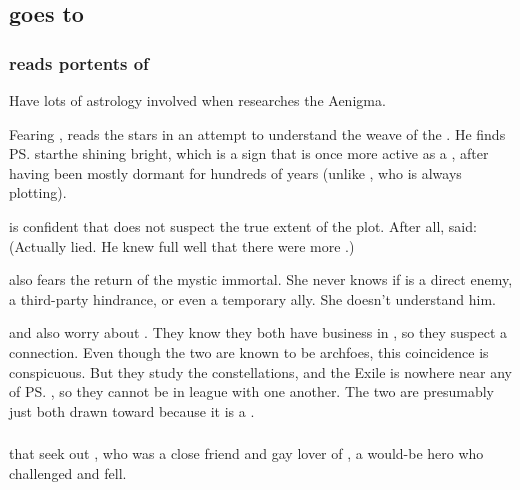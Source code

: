\subsection{\Teshrial goes to \Urizeth}
\subsubsection{\Teshrial{} reads portents of \Ishnaruchaefir}
Have lots of astrology involved when \Teshrial{} researches the Aenigma. 

Fearing \Ishnaruchaefir, \Teshrial{} reads the stars in an attempt to understand the weave of the \matrices. 
He finds \ps{\Ishnaruchaefir} star\dash the \dash shining bright, which is a sign that \Ishnaruchaefir{} is once more active as a \vertex, after having been mostly dormant for hundreds of years (unlike \Secherdamon, who is always plotting). 

\Teshrial{} is confident that \Ishnaruchaefir{} does not suspect the true extent of the \noggyal{} plot. 
After all, \Ishnaruchaefir{} said: 
(Actually \Ishnaruchaefir{} lied. 
 He knew full well that there were more \noggyaleth.)

\Achsah{} also fears the return of the mystic immortal. 
She never knows if \Ishnaruchaefir{} is a direct enemy, a third-party hindrance, or even a temporary ally. 
She doesn't understand him. 

\Achsah{} and \Teshrial{} also worry about \Secherdamon.
They know they both have business in \Malcur, so they suspect a connection. 
Even though the two are known to be archfoes, this coincidence is conspicuous. 
But they study the constellations, and the Exile is nowhere near any of \ps{\Secherdamon} \matrices, so they cannot be in league with one another. 
The two are presumably just both drawn toward \Malcur because it is a \nexus. 





\subsubsection{\Nemuragh}
\Menessiaraid{}  that \Teshrial{} seek out , who was a close friend and gay lover of \Lothagiel, a would-be hero who challenged \Ishnaruchaefir{} and fell. 

